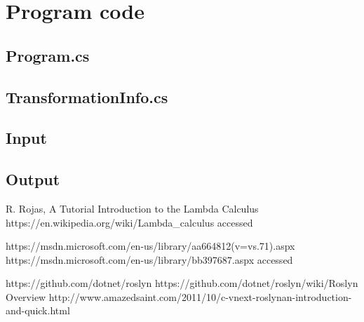 \documentclass[]{report}
\begin{document}
\pagebreak

    \section{Program code}

   \subsection{Program.cs}


    
    \pagebreak
    \subsection{TransformationInfo.cs}
    
    \pagebreak
    \subsection{Input}
        
            \pagebreak
    \subsection{Output}
          
                  
    
    
\begin{thebibliography}{80}
     R. Rojas, A Tutorial Introduction to the Lambda Calculus
     https://en.wikipedia.org/wiki/Lambda\_calculus accessed \date{01.05.2017}
     https://msdn.microsoft.com/en-us/library/aa664812(v=vs.71).aspx
     https://msdn.microsoft.com/en-us/library/bb397687.aspx
    accessed \date{01.05.2017}
     https://github.com/dotnet/roslyn
     https://github.com/dotnet/roslyn/wiki/Roslyn Overview
     http://www.amazedsaint.com/2011/10/c-vnext-roslynan-introduction-and-quick.html
    

\end{thebibliography}
\end{document}
